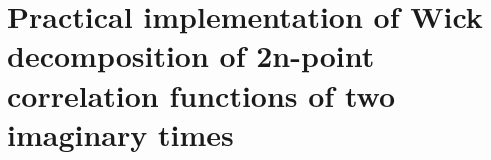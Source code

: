 

\section{Practical implementation of Wick decomposition of 2n-point correlation functions of two imaginary times } \label{sec:wick}

